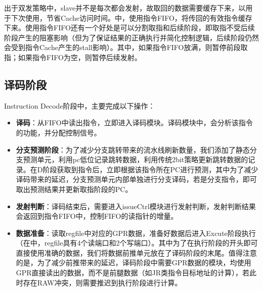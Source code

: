 出于双发策略中，slave并不是每次都会发射，故取回的数据需要缓存下来，以用于下次使用，节省Cache访问时间。\cpuname 中，使用指令FIFO，将传回的有效指令缓存下来。使用指令FIFO还有一个好处是可以分割取指和后续阶段，即取指不受后续阶段产生的阻塞影响（但为了保证结果的正确执行并简化控制逻辑，后续阶段仍然会受到指令Cache产生的stall影响）。其中，如果指令FIFO放满，则暂停前段取指；如果指令FIFO为空，则暂停后续发射。

\subsection{译码阶段}
Instruction Decode阶段中，主要完成以下操作：
\begin{itemize}
    \item \textbf{译码}：从FIFO中读出指令，立即进入译码模块。译码模块中，会分析该指令的功能，并分配控制信号。
    \item \textbf{分支预测阶段}：为了减少分支跳转带来的流水线刷新数量，我们添加了静态分支预测单元，利用pc低位记录跳转数据，利用传统2bit策略更新跳转数据的记录。在D阶段获取到指令后，立即根据该指令所在PC进行预测，其中为了减少译码带来的延迟，分支预测单元内部单独进行分支译码，若是分支指令，即可取出预测结果并更新取指阶段的PC。
    \item \textbf{发射判断}：译码结束后，需要进入issueCtrl模块进行发射判断，发射判断结果会返回到指令FIFO中，控制FIFO的读指针的增量。
    \item \textbf{数据准备}：读取regfile中对应的GPR数据，准备好数据后进入Excute阶段执行（在\cpuname 中，regfile具有4个读端口和2个写端口）。其中为了在执行阶段的开头即可直接使用准确的数据，我们将数据前推单元放在了译码阶段的末尾。值得注意的是，为了减少前推带来的延迟，译码阶段中需要GPR数据的模块，均使用GPR直接读出的数据，而不是前腿数据（如JR类指令目标地址的计算），若此时存在RAW冲突，则需要推迟到执行阶段进行计算。
\end{itemize}

